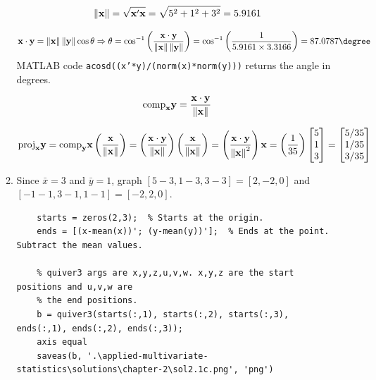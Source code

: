 \begin{enumerate}[font=\bfseries]
\begin{enumerate}
\[
    \|\bold{x}\| = \sqrt{\bold{x}^\prime \bold{x}} = \sqrt{5^2 + 1^2 + 3^2} = 5.9161
\]

\[
    \bold{x} \cdot \bold{y} = \left\|\bold{x}\right\| \left\|\bold{y}\right\| \cos{\theta} 
    \Rightarrow \theta = \cos^{-1}{\left(\frac{\bold{x} \cdot \bold{y}}{\left\|\bold{x}\right\| \left\|\bold{y}\right\|}\right)} = \cos^{-1}{\left(\frac{1}{5.9161 \times 3.3166}\right)} = 87.0787 \degree
\]
MATLAB code \texttt{acosd((x'*y)/(norm(x)*norm(y)))} returns the angle in degrees.

\[
    \text{comp}_{\bold{x}}\bold{y} = \frac{\bold{x} \cdot \bold{y}}{\left\| \bold{x} \right\|}
\]

\[
    \text{proj}_{\bold{x}}\bold{y} = \text{comp}_{\bold{y}}\bold{x}\left(\frac{\bold{x}}{\left\|\bold{x}\right\|}\right) = \left(\frac{\bold{x} \cdot \bold{y}}{\left\| \bold{x} \right\|}\right) \left(\frac{\bold{x}}{\left\| \bold{x} \right\|}\right) = \left(\frac{\bold{x} \cdot \bold{y}}{\left\| \bold{x} \right\|^2}\right) \bold{x} = \left(\frac{1}{35}\right) \begin{bmatrix}
        5 \\
        1 \\
        3
    \end{bmatrix} =
    \begin{bmatrix}
        5/35 \\
        1/35 \\
        3/35
    \end{bmatrix}
\]

            \item Since $\bar{x} = 3$ and $\bar{y} = 1$, graph $[5-3, 1-3, 3-3] = [2, -2, 0]$ and $[-1-1, 3-1, 1-1] = [-2,2,0]$.
            
        \begin{lstlisting}
    starts = zeros(2,3);  % Starts at the origin.
    ends = [(x-mean(x))'; (y-mean(y))'];  % Ends at the point. Subtract the mean values.
    
    % quiver3 args are x,y,z,u,v,w. x,y,z are the start positions and u,v,w are
    % the end positions.
    b = quiver3(starts(:,1), starts(:,2), starts(:,3), ends(:,1), ends(:,2), ends(:,3));
    axis equal
    saveas(b, '.\applied-multivariate-statistics\solutions\chapter-2\sol2.1c.png', 'png')
        \end{lstlisting}


\end{enumerate}
\end{enumerate}
